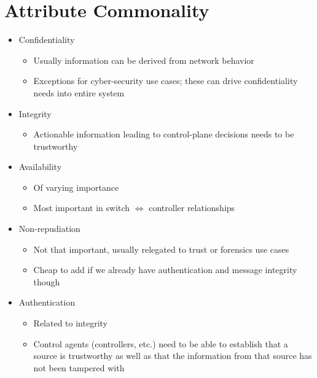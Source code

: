 \documentclass[12pt,letterpaper]{article}
\begin{document}
\section{Attribute Commonality}
\begin{itemize}
\item {\color{green} Confidentiality}
	\begin{itemize}
	\item Usually information can be derived from network behavior
	\item Exceptions for cyber-security use cases; these can drive confidentiality needs into entire system
	\end{itemize}
\item {\color{red} Integrity}
	\begin{itemize}
	\item Actionable information leading to control-plane decisions needs to be trustworthy
	\end{itemize}
\item {\color{orange} Availability}
	\begin{itemize}
	\item Of varying importance
	\item Most important in switch $\Longleftrightarrow$ controller relationships
	\end{itemize}
\item {\color{green} Non-repudiation}
	\begin{itemize}
	\item Not that important, usually relegated to trust or forensics use cases
	\item Cheap to add if we already have authentication and message integrity though
	\end{itemize}
\item {\color{red} Authentication}
	\begin{itemize}
	\item Related to integrity
	\item Control agents (controllers, etc.) need to be able to establish that a source is trustworthy as well as that the information from that source has not been tampered with
	\end{itemize}
\end{itemize}

\newpage
\end{document}
